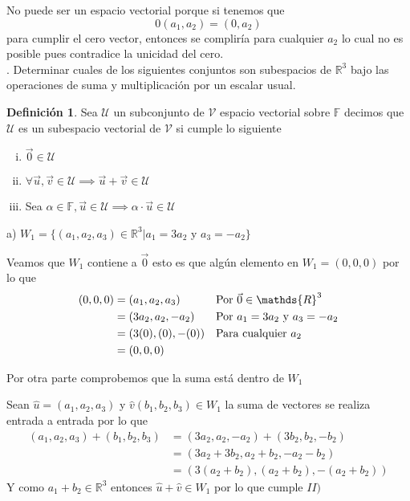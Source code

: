 \documentclass[letterpaper]{article}
\newcommand{\F}{\mathds{F}}
\newcommand{\R}{\mathds{R}}
\renewcommand{\*}{\cdot}
\theoremstyle{definition}
\newtheorem{definition}{Definición}
\begin{document}
No puede ser un espacio vectorial porque si tenemos que \[ 0(a_1, a_2) = (0, a_2)  \] para cumplir el cero vector, entonces se compliría para cualquier $a_2$ lo cual no es posible pues contradice la unicidad del cero.\\

. Determinar cuales de los siguientes conjuntos son subespacios de $\mathbb{R}^{3}$ bajo las operaciones de suma y multiplicación por un escalar usual.
\begin{definition}
	Sea $ \mathcal{U} $ un subconjunto de $ \mathcal{V}$ espacio vectorial sobre $ \F $ decimos que $ \mathcal{U} $ es un subespacio vectorial de $ \mathcal{V} $ si cumple lo siguiente
	
	\begin{enumerate}[i)]
		\item $ \vec{0}  \in \mathcal{U} $
		\item $ \forall \vec{u}, \vec{v} \in \mathcal{U} \implies \vec{u} + \vec{v} \in \mathcal{U} $
		\item Sea $ \alpha \in \F, \vec{u} \in \mathcal{U} \implies \alpha \* \vec{u} \in \mathcal{U} $
	\end{enumerate}
	   
\end{definition}

a) $W_{1} = \lbrace (a_{1},a_{2},a_{3}) \in \mathbb{R}^{3} \big\vert  a_{1}=3a_{2}$ y $a_{3}=-a_{2} \rbrace$

Veamos que $ W_{1} $ contiene a $ \vec{0} $ esto es que algún elemento en $ W_{1} = (0,0,0) $ por lo que 
	\begin{align*}
		(0,0,0) &= (a_{1},a_{2},a_{3}) && \text{Por $ \vec{0} \in \R^3 $}\\
		&= (3a_{2},a_{2},-a_{2}) && \text{Por $a_{1}=3a_{2}$ y $a_{3}=-a_{2}$}\\
		&= (3(0),(0),-(0)) && \text{Para cualquier $ a_2 $}\\
		&= (0,0,0)
	\end{align*}
	
Por otra parte comprobemos que la suma está dentro de $ W_1 $ 

Sean $ \hat{u} = (a_{1},a_{2},a_{3})  $ y $\hat{v} (b_{1},b_{2},b_{3})  \in W_1$ la suma de vectores se realiza entrada a entrada por lo que
\begin{align*}
	(a_{1},a_{2},a_{3}) + (b_{1},b_{2},b_{3}) &= (3a_{2},a_{2},-a_{2}) + (3b_{2},b_{2},-b_{2})\\
	&= (3 a_2 + 3b_2, a_2 + b_2, -a_2 - b_2)\\
	&= (3( a_2 + b_2), (a_2 + b_2), -(a_2 +b_2))
\end{align*}
 Y como $ a_1 + b_2 \in \R^3$ entonces $ \hat{u} + \hat{v} \in W_1 $ por lo que cumple $ II) $\\
 
\end{document}
